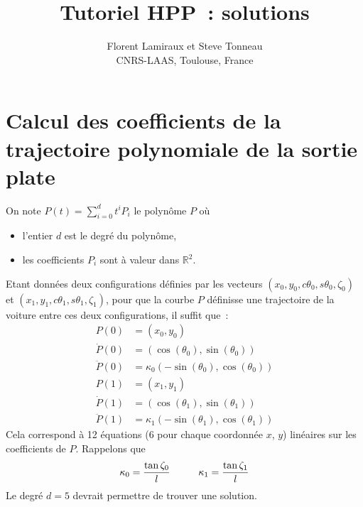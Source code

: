 \documentclass {article}
\author {Florent Lamiraux et Steve Tonneau\\
CNRS-LAAS, Toulouse, France}
\title {Tutoriel HPP~: solutions}
\date {}
\def\real{{\mathbb R}}
\begin{document}
\maketitle

\section {Calcul des coefficients de la trajectoire polynomiale de la sortie plate}

On note $P(t) = \sum_{i=0}^{d} t^i P_i$ le polyn\^ome $P$ où
\begin {itemize}
\item l'entier $d$ est le degré du polyn\^ome,
\item les coefficients $P_i$ sont à valeur dans $\real^2$.
\end {itemize}
Etant données deux configurations définies par les vecteurs $(x_0,y_0,c\theta_0,s\theta_0,\zeta_0)$ et $(x_1,y_1,c\theta_1,s\theta_1,\zeta_1)$, pour que la courbe $P$ définisse une trajectoire de la voiture entre ces deux configurations, il suffit que~:
\begin {align}\label{eq:constraints-0}
  P (0) &= (x_0, y_0) \\
  \dot {P} (0) &= (\cos (\theta_0), \sin (\theta_0)) \\
  \ddot {P} (0) &= \kappa_0 (-\sin (\theta_0), \cos (\theta_0)) \\
  P (1) &= (x_1, y_1) \\
  \dot {P} (1) &= (\cos (\theta_1), \sin (\theta_1)) \\
  \label{eq:constraints-1}
  \ddot {P} (1) &= \kappa_1 (-\sin (\theta_1), \cos (\theta_1))
\end {align}
Cela correspond à 12 équations (6 pour chaque coordonnée $x$, $y$) linéaires sur les coefficients de $P$. Rappelons que
$$
\kappa_{0} = \frac {\tan \zeta_{0}}{l} \hspace*{1cm} \kappa_{1} = \frac {\tan \zeta_{1}}{l}
$$
Le degré $d=5$ devrait permettre de trouver une solution.
\end{document}
